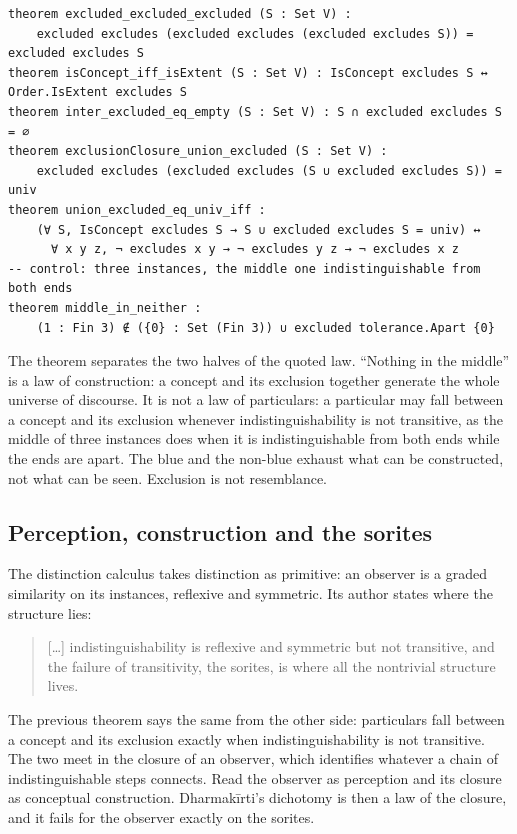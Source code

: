 \documentclass[11pt]{article}
\theoremstyle{plain}
\theoremstyle{definition}
\begin{document}
\begin{lstlisting}
theorem excluded_excluded_excluded (S : Set V) :
    excluded excludes (excluded excludes (excluded excludes S)) = excluded excludes S
theorem isConcept_iff_isExtent (S : Set V) : IsConcept excludes S ↔ Order.IsExtent excludes S
theorem inter_excluded_eq_empty (S : Set V) : S ∩ excluded excludes S = ∅
theorem exclusionClosure_union_excluded (S : Set V) :
    excluded excludes (excluded excludes (S ∪ excluded excludes S)) = univ
theorem union_excluded_eq_univ_iff :
    (∀ S, IsConcept excludes S → S ∪ excluded excludes S = univ) ↔
      ∀ x y z, ¬ excludes x y → ¬ excludes y z → ¬ excludes x z
-- control: three instances, the middle one indistinguishable from both ends
theorem middle_in_neither :
    (1 : Fin 3) ∉ ({0} : Set (Fin 3)) ∪ excluded tolerance.Apart {0}
\end{lstlisting}

\noindent The theorem separates the two halves of the quoted law. ``Nothing in the middle'' is
a law of construction: a concept and its exclusion together generate the whole universe of
discourse. It is not a law of particulars: a particular may fall between a concept and its
exclusion whenever indistinguishability is not transitive, as the middle of three instances
does when it is indistinguishable from both ends while the ends are apart. The blue and the
non-blue exhaust what can be constructed, not what can be seen. Exclusion is not resemblance.

\subsection{Perception, construction and the sorites}
\label{sec:sorites}

The distinction calculus \cite{GoertzelDCalc} takes distinction as primitive: an observer is a
graded similarity on its instances, reflexive and symmetric. Its author states where the
structure lies:

\begin{quote}
[\ldots] indistinguishability is reflexive and symmetric but not transitive, and the failure of
transitivity, the sorites, is where all the nontrivial structure lives.
\end{quote}

\noindent The previous theorem says the same from the other side: particulars fall between a
concept and its exclusion exactly when indistinguishability is not transitive. The two meet in the
closure of an observer, which identifies whatever a chain of indistinguishable steps connects.
Read the observer as perception and its closure as conceptual construction. Dharmakīrti's
dichotomy is then a law of the closure, and it fails for the observer exactly on the sorites.
\end{document}
